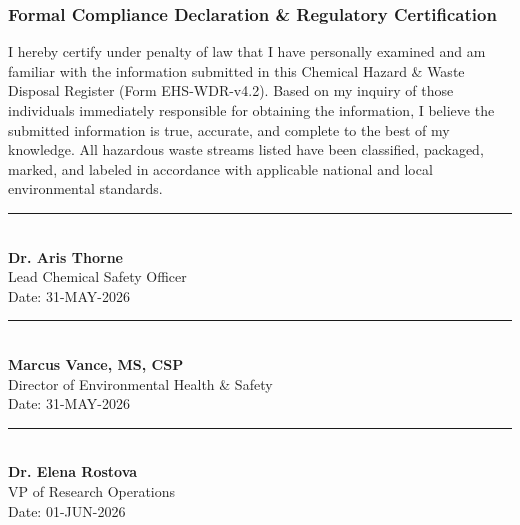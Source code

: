 \documentclass[10pt,a4paper]{article}
\begin{document}
\begin{tcolorbox}[
  enhanced,
  colback=white,
  colframe=NavyPrimary,
  arc=3pt,
  boxrule=0.8pt,
  top=6pt, bottom=6pt, left=8pt, right=8pt
]
  \subsubsection*{\fontsize{9}{10}\selectfont\bfseries\color{NavyPrimary}Formal Compliance Declaration \& Regulatory Certification}
  \vspace{-2pt}
  \fontsize{8}{9.5}\selectfont\color{TextDark}
  I hereby certify under penalty of law that I have personally examined and am familiar with the information submitted in this Chemical Hazard \& Waste Disposal Register (Form EHS-WDR-v4.2). Based on my inquiry of those individuals immediately responsible for obtaining the information, I believe the submitted information is true, accurate, and complete to the best of my knowledge. All hazardous waste streams listed have been classified, packaged, marked, and labeled in accordance with applicable national and local environmental standards.

  \vspace{22pt}

  \begin{minipage}[t]{0.31\textwidth}
    \centering
    \rule{0.85\textwidth}{0.5pt}\\[3pt]
    \textbf{Dr. Aris Thorne}\\[1pt]
    {\tiny\color{TextMuted}Lead Chemical Safety Officer}\\
    {\tiny\color{TextMuted}Date: 31-MAY-2026}
  \end{minipage}%
  \hfill
  \begin{minipage}[t]{0.31\textwidth}
    \centering
    \rule{0.85\textwidth}{0.5pt}\\[3pt]
    \textbf{Marcus Vance, MS, CSP}\\[1pt]
    {\tiny\color{TextMuted}Director of Environmental Health \& Safety}\\
    {\tiny\color{TextMuted}Date: 31-MAY-2026}
  \end{minipage}%
  \hfill
  \begin{minipage}[t]{0.31\textwidth}
    \centering
    \rule{0.85\textwidth}{0.5pt}\\[3pt]
    \textbf{Dr. Elena Rostova}\\[1pt]
    {\tiny\color{TextMuted}VP of Research Operations}\\
    {\tiny\color{TextMuted}Date: 01-JUN-2026}
  \end{minipage}
\end{tcolorbox}
\end{document}
